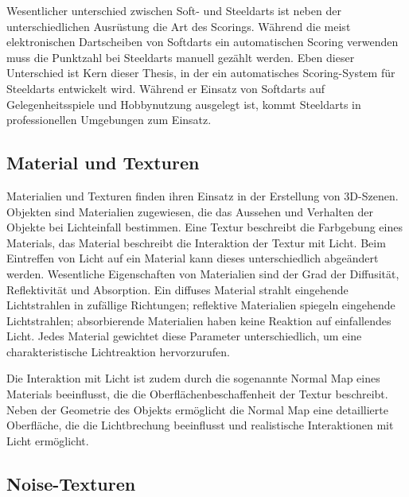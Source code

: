 Wesentlicher unterschied zwischen Soft- und Steeldarts ist neben der unterschiedlichen Ausrüstung die Art des Scorings. Während die meist elektronischen Dartscheiben von Softdarts ein automatischen Scoring verwenden muss die Punktzahl bei Steeldarts manuell gezählt werden. Eben dieser Unterschied ist Kern dieser Thesis, in der ein automatisches Scoring-System für Steeldarts entwickelt wird. Während er Einsatz von Softdarts auf Gelegenheitsspiele und Hobbynutzung ausgelegt ist, kommt Steeldarts in professionellen Umgebungen zum Einsatz.


\subsection{Material und Texturen}  %

Materialien und Texturen finden ihren Einsatz in der Erstellung von 3D-Szenen. Objekten sind Materialien zugewiesen, die das Aussehen und Verhalten der Objekte bei Lichteinfall bestimmen. Eine Textur beschreibt die Farbgebung eines Materials, das Material beschreibt die Interaktion der Textur mit Licht. Beim Eintreffen von Licht auf ein Material kann dieses unterschiedlich abgeändert werden. Wesentliche Eigenschaften von Materialien sind der Grad der Diffusität, Reflektivität und Absorption. Ein diffuses Material strahlt eingehende Lichtstrahlen in zufällige Richtungen; reflektive Materialien spiegeln eingehende Lichtstrahlen; absorbierende Materialien haben keine Reaktion auf einfallendes Licht. Jedes Material gewichtet diese Parameter unterschiedlich, um eine charakteristische Lichtreaktion hervorzurufen.

Die Interaktion mit Licht ist zudem durch die sogenannte Normal Map eines Materials beeinflusst, die die Oberflächenbeschaffenheit der Textur beschreibt. Neben der Geometrie des Objekts ermöglicht die Normal Map eine detaillierte Oberfläche, die die Lichtbrechung beeinflusst und realistische Interaktionen mit Licht ermöglicht.


\subsection{Noise-Texturen}
\label{sec:noise}


